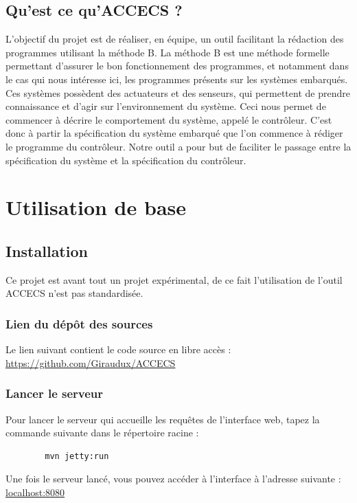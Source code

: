 \documentclass[a4paper]{article}
\begin{document}
\subsection{Qu'est ce qu'ACCECS ?}

    L'objectif du projet est de réaliser, en équipe, un outil facilitant la rédaction des programmes utilisant la méthode B. La méthode B est une méthode formelle permettant d'assurer le bon fonctionnement des programmes, et notamment dans le cas qui nous intéresse ici, les programmes présents sur les systèmes embarqués. Ces systèmes possèdent des actuateurs et des senseurs, qui permettent de prendre connaissance et d'agir sur l'environnement du système. Ceci nous permet de commencer à décrire le comportement du système, appelé le contrôleur. C'est donc à partir la spécification du système embarqué que l'on commence à rédiger le programme du contrôleur. Notre outil a pour but de faciliter le passage entre la spécification du système et la spécification du contrôleur.

\section{Utilisation de base}\label{sec:utilisation}
\subsection{Installation}
Ce projet est avant tout un projet expérimental, de ce fait l'utilisation de l'outil ACCECS n'est pas standardisée.

\subsubsection{Lien du dépôt des sources}
    Le lien suivant contient le code source en libre accès :
    \url{https://github.com/Giraudux/ACCECS}

\subsubsection{Lancer le serveur}
    Pour lancer le serveur qui accueille les requêtes de l'interface web, tapez la commande suivante dans le répertoire racine :
    \begin{lstlisting}
        mvn jetty:run
    \end{lstlisting}
    
    Une fois le serveur lancé, vous pouvez accéder à l'interface à l'adresse suivante :
    \url{localhost:8080}
\end{document}
